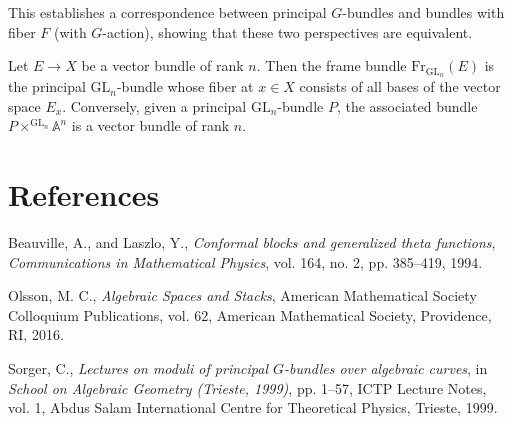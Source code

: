 \documentclass[12pt]{article}
\begin{document}
This establishes a correspondence between principal $G$-bundles and bundles with fiber $F$ (with $G$-action), showing that these two perspectives are equivalent.

\begin{example}
    Let $E \to X$ be a vector bundle of rank $n$. Then the frame bundle $\text{Fr}_{\text{GL}_n}(E)$ is the principal $\text{GL}_n$-bundle whose fiber at $x \in X$ consists of all bases of the vector space $E_x$. Conversely, given a principal $\text{GL}_n$-bundle $P$, the associated bundle $P \times^{\text{GL}_n} \mathbb{A}^n$ is a vector bundle of rank $n$.
\end{example}


\section{References}
\begin{enumerate}
    Beauville, A., and Laszlo, Y.,
    \textit{Conformal blocks and generalized theta functions},
    \textit{Communications in Mathematical Physics},
    vol. 164, no. 2, pp. 385--419, 1994.

    Olsson, M. C.,
    \textit{Algebraic Spaces and Stacks},
    American Mathematical Society Colloquium Publications, vol. 62,
    American Mathematical Society, Providence, RI, 2016.

    Sorger, C.,
    \textit{Lectures on moduli of principal $G$-bundles over algebraic curves},
    in \textit{School on Algebraic Geometry (Trieste, 1999)}, pp. 1--57,
    ICTP Lecture Notes, vol. 1, Abdus Salam International Centre for Theoretical Physics, Trieste, 1999.
\end{enumerate}
\end{document}
